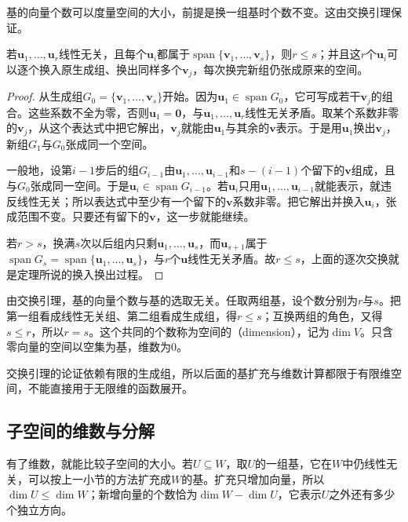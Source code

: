 基的向量个数可以度量空间的大小，前提是换一组基时个数不变。这由交换引理保证。
\begin{theorem}[交换引理]
\label{thm:ls-exchange-lemma}
若$\bm u_1,\ldots,\bm u_r$线性无关，且每个$\bm u_i$都属于$\operatorname{span}\{\bm v_1,\ldots,\bm v_s\}$，则$r\leq s$；并且这$r$个$\bm u_i$可以逐个换入原生成组、换出同样多个$\bm v_j$，每次换完新组仍张成原来的空间。
\end{theorem}
\begin{proof}
从生成组$G_0=\{\bm v_1,\ldots,\bm v_s\}$开始。因为$\bm u_1\in\operatorname{span}G_0$，它可写成若干$\bm v_j$的组合。这些系数不全为零，否则$\bm u_1=\bm0$，与$\bm u_1,\ldots,\bm u_r$线性无关矛盾。取某个系数非零的$\bm v_j$，从这个表达式中把它解出，$\bm v_j$就能由$\bm u_1$与其余的$\bm v$表示。于是用$\bm u_1$换出$\bm v_j$，新组$G_1$与$G_0$张成同一个空间。

一般地，设第$i-1$步后的组$G_{i-1}$由$\bm u_1,\ldots,\bm u_{i-1}$和$s-(i-1)$个留下的$\bm v$组成，且与$G_0$张成同一空间。于是$\bm u_i\in\operatorname{span}G_{i-1}$。若$\bm u_i$只用$\bm u_1,\ldots,\bm u_{i-1}$就能表示，就违反线性无关；所以表达式中至少有一个留下的$\bm v$系数非零。把它解出并换入$\bm u_i$，张成范围不变。只要还有留下的$\bm v$，这一步就能继续。

若$r>s$，换满$s$次以后组内只剩$\bm u_1,\ldots,\bm u_s$，而$\bm u_{s+1}$属于$\operatorname{span}G_s=\operatorname{span}\{\bm u_1,\ldots,\bm u_s\}$，与$r$个$\bm u$线性无关矛盾。故$r\leq s$，上面的逐次交换就是定理所说的换入换出过程。
\end{proof}

由交换引理，基的向量个数与基的选取无关。任取两组基，设个数分别为$r$与$s$。把第一组看成线性无关组、第二组看成生成组，得$r\leq s$；互换两组的角色，又得$s\leq r$，所以$r=s$。这个共同的个数称为空间的（dimension），记为$\dim V$。只含零向量的空间以空集为基，维数为$0$。

交换引理的论证依赖有限的生成组，所以后面的基扩充与维数计算都限于有限维空间，不能直接用于无限维的函数展开。

\subsection{子空间的维数与分解}
有了维数，就能比较子空间的大小。若$U\subseteq W$，取$U$的一组基，它在$W$中仍线性无关，可以按上一小节的方法扩充成$W$的基。扩充只增加向量，所以$\dim U\leq\dim W$；新增向量的个数恰为$\dim W-\dim U$，它表示$U$之外还有多少个独立方向。

